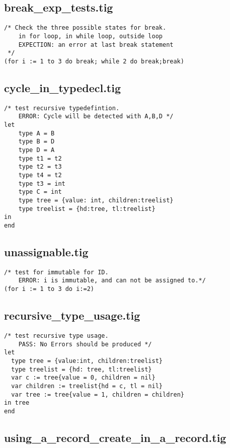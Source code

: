 \documentclass{article}
\begin{document}

\subsection{break\_exp\_tests.tig}

\begin{lstlisting}[frame=single]
/* Check the three possible states for break.
	in for loop, in while loop, outside loop
	EXPECTION: an error at last break statement
 */
(for i := 1 to 3 do break; while 2 do break;break)
\end{lstlisting}

\subsection{cycle\_in\_typedecl.tig}

\begin{lstlisting}[frame=single]
/* test recursive typedefintion.
	ERROR: Cycle will be detected with A,B,D */
let
	type A = B
	type B = D
	type D = A
	type t1 = t2
	type t2 = t3
	type t4 = t2
	type t3 = int
	type C = int
	type tree = {value: int, children:treelist}
	type treelist = {hd:tree, tl:treelist}
in 
end
\end{lstlisting}

\subsection{unassignable.tig}

\begin{lstlisting}[frame=single]
/* test for immutable for ID.
	ERROR: i is immutable, and can not be assigned to.*/
(for i := 1 to 3 do i:=2)
\end{lstlisting}

\subsection{recursive\_type\_usage.tig}

\begin{lstlisting}[frame=single]
 /* test recursive type usage.
	PASS: No Errors should be produced */
let
  type tree = {value:int, children:treelist}
  type treelist = {hd: tree, tl:treelist}
  var c := tree{value = 0, children = nil}
  var children := treelist{hd = c, tl = nil}
  var tree := tree{value = 1, children = children}
in tree
end
\end{lstlisting}

\subsection{using\_a\_record\_create\_in\_a\_record.tig}
\end{document}

